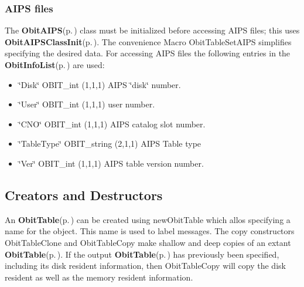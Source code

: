 \subsubsection{AIPS files}\label{ObitTable_8h_ObitTableAIPS}
The {\bf Obit\-AIPS}{\rm (p.\,\pageref{structObitAIPS})} class must be initialized before accessing AIPS files; this uses {\bf Obit\-AIPSClass\-Init}{\rm (p.\,\pageref{ObitAIPS_8c_a5})}. The convenience Macro Obit\-Table\-Set\-AIPS simplifies specifying the desired data. For accessing AIPS files the following entries in the {\bf Obit\-Info\-List}{\rm (p.\,\pageref{structObitInfoList})} are used: \begin{itemize}
\item \char`\"{}Disk\char`\"{} OBIT\_\-int (1,1,1) AIPS \char`\"{}disk\char`\"{} number. \item \char`\"{}User\char`\"{} OBIT\_\-int (1,1,1) user number. \item \char`\"{}CNO\char`\"{} OBIT\_\-int (1,1,1) AIPS catalog slot number. \item \char`\"{}Table\-Type\char`\"{} OBIT\_\-string (2,1,1) AIPS Table type \item \char`\"{}Ver\char`\"{} OBIT\_\-int (1,1,1) AIPS table version number.\end{itemize}
\subsection{Creators and Destructors}\label{ObitTable_8h_ObitTableaccess}
An {\bf Obit\-Table}{\rm (p.\,\pageref{structObitTable})} can be created using new\-Obit\-Table which allos specifying a name for the object. This name is used to label messages. The copy constructors Obit\-Table\-Clone and Obit\-Table\-Copy make shallow and deep copies of an extant {\bf Obit\-Table}{\rm (p.\,\pageref{structObitTable})}. If the output {\bf Obit\-Table}{\rm (p.\,\pageref{structObitTable})} has previously been specified, including its disk resident information, then Obit\-Table\-Copy will copy the disk resident as well as the memory resident information.

